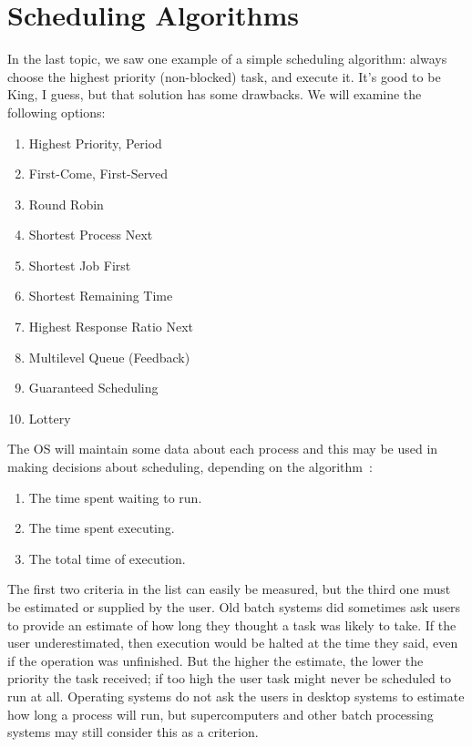 




\section*{Scheduling Algorithms}

In the last topic, we saw one example of a simple scheduling algorithm: always choose the highest priority (non-blocked) task, and execute it. It's good to be King, I guess, but that solution has some drawbacks. We will examine the following options:
\begin{enumerate}
	\item Highest Priority, Period
	\item First-Come, First-Served
	\item Round Robin
	\item Shortest Process Next
	\item Shortest Job First
	\item Shortest Remaining Time
	\item Highest Response Ratio Next
	\item Multilevel Queue (Feedback)
	\item Guaranteed Scheduling
	\item Lottery
\end{enumerate}

The OS will maintain some data about each process and this may be used in making decisions about scheduling, depending on the algorithm~\cite{osi}:

\begin{enumerate}
	\item The time spent waiting to run.
	\item The time spent executing.
	\item The total time of execution.
\end{enumerate}

The first two criteria in the list can easily be measured, but the third one must be estimated or supplied by the user. Old batch systems did sometimes ask users to provide an estimate of how long they thought a task was likely to take. If the user underestimated, then execution would be halted at the time they said, even if the operation was unfinished. But the higher the estimate, the lower the priority the task received; if too high the user task might never be scheduled to run at all. Operating systems do not ask the users in desktop systems to estimate how long a process will run, but supercomputers and other batch processing systems may still consider this as a criterion.

